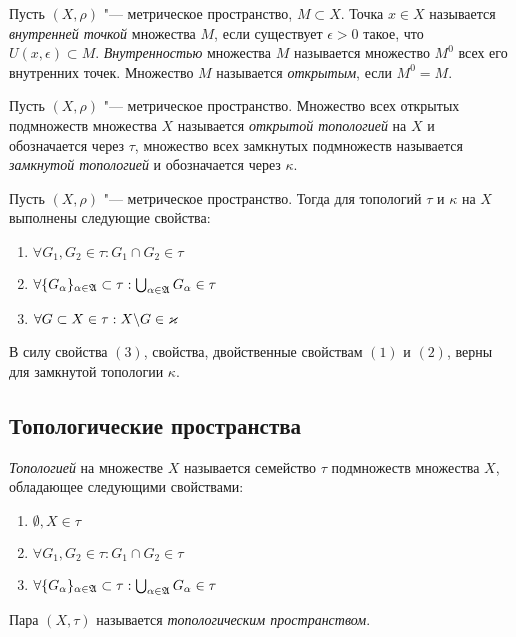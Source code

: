 \begin{definition}
	Пусть $(X, \rho)$ "--- метрическое пространство, $M \subset X$. Точка $x \in X$ называется \textit{внутренней точкой} множества $M$, если существует $\epsilon > 0$ такое, что $U(x, \epsilon) \subset M$. \textit{Внутренностью} множества $M$ называется множество $M^0$ всех его внутренних точек. Множество $M$ называется \textit{открытым}, если $M^0 = M$.
\end{definition}

\begin{definition}
	Пусть $(X, \rho)$ "--- метрическое пространство. Множество всех открытых подмножеств множества $X$ называется \textit{открытой топологией} на $X$ и обозначается через $\tau$, множество всех замкнутых подмножеств называется \textit{замкнутой топологией} и обозначается через $\kappa$.
\end{definition}

\begin{note}
	Пусть $(X, \rho)$ "--- метрическое пространство. Тогда для топологий $\tau$ и $\kappa$ на $X$ выполнены следующие свойства:
	\begin{enumerate}
		\item $\forall G_1, G_2 \in \tau: G_1 \cap G_2 \in \tau$
		\item $\forall \{G_\alpha\}_{\alpha \in \mathfrak A} \subset \tau: \bigcup_{\alpha \in \mathfrak A}G_\alpha \in \tau$
		\item $\forall G \subset X \in \tau: X \backslash G \in \varkappa$
	\end{enumerate}
	
	В силу свойства $(3)$, свойства, двойственные свойствам $(1)$ и $(2)$, верны для замкнутой топологии $\kappa$.
\end{note}

\subsection{Топологические пространства}

\begin{definition}
	\textit{Топологией} на множестве $X$ называется семейство $\tau$ подмножеств множества $X$, обладающее следующими свойствами:
	\begin{enumerate}
		\item $\emptyset, X \in \tau$
		\item $\forall G_1, G_2 \in \tau: G_1 \cap G_2 \in \tau$
		\item $\forall \{G_\alpha\}_{\alpha \in \mathfrak A} \subset \tau: \bigcup_{\alpha \in \mathfrak A}G_\alpha\in \tau$
	\end{enumerate}
	
	Пара $(X, \tau)$ называется \textit{топологическим пространством}.
\end{definition}

